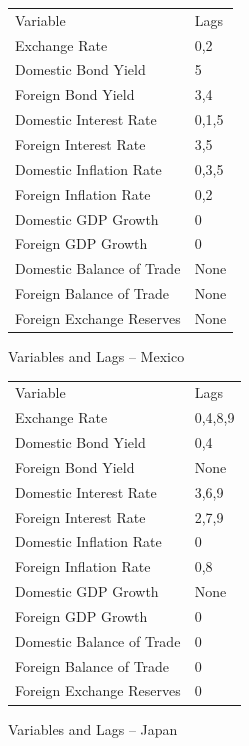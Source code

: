 \documentclass{sig-alternate-05-2015}
\begin{document}
\begin{figure}
\centering
\caption{Variables and Lags -- Mexico}
\begin{tabular}{l l}
Variable 					& Lags  \\
Exchange Rate 				& 0,2		\\
Domestic Bond Yield			& 5		\\
Foreign Bond Yield			& 3,4	\\
Domestic Interest Rate		& 0,1,5	\\
Foreign Interest Rate		& 3,5	\\
Domestic Inflation Rate		& 0,3,5	\\
Foreign Inflation Rate		& 0,2		\\
Domestic GDP Growth			& 0		\\
Foreign GDP Growth			& 0		\\
Domestic Balance of Trade	& None	\\
Foreign Balance of Trade		& None	\\
Foreign Exchange Reserves	& None		\\
\end{tabular}
\label{tab:mexico_vars}
\end{figure}

\begin{figure}
\centering
\caption{Variables and Lags -- Japan}
\begin{tabular}{l l}
Variable 					& Lags  \\
Exchange Rate 				& 0,4,8,9		\\
Domestic Bond Yield			& 0,4	\\
Foreign Bond Yield			& None	\\
Domestic Interest Rate		& 3,6,9	\\
Foreign Interest Rate		& 2,7,9	\\
Domestic Inflation Rate		& 0	\\
Foreign Inflation Rate		& 0,8	\\
Domestic GDP Growth			& None	\\
Foreign GDP Growth			& 0		\\
Domestic Balance of Trade	& 0	\\
Foreign Balance of Trade		& 0	\\
Foreign Exchange Reserves	& 0	\\
\end{tabular}
\label{tab:japan_vars}
\end{figure}
\end{document}

